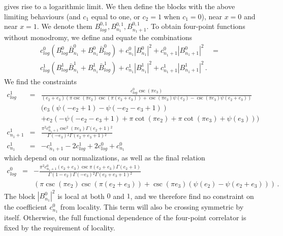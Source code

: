 \documentclass[12pt]{article}
\numberwithin{equation}{section}
\numberwithin{equation}{section}
\numberwithin{table}{section}\setlength{\multlinegap}{25pt}
\begin{document}
gives rise to a logarithmic limit.
We then define the blocks  with the above limiting behaviours (and $c_1$ equal to one, or $c_2=1$ when $c_1=0$), near $x=0$ and near $x=1$. We denote them
$B_{log}^{0,1},B_{n_1}^{0,1}, B_{n_1+1}^{0,1}$. To obtain four-point functions without monodromy, we define and equate
the combinations
\begin{eqnarray}
c^0_{log} (B_{log}^0  \bar{B}_{n_1}^0+ B_{n_1}^0 \bar{B}_{log}^0)
+c^0_{n_1} | B_{n_1}^0 |^2
+c^0_{n_1+1} |B_{n_1+1}^0 |^2
&=& \nonumber \\
 c^1_{log} (B_{log}^1  \bar{B}_{n_1}^1+ B_{n_1}^1 \bar{B}_{log}^1)
+c^1_{n_1} | B_{n_1}^1 |^2
+c^1_{n_1+1} |B_{n_1+1}^1 |^2 \, .
& & 
\end{eqnarray}
We find the constraints
\begin{eqnarray}
c^1_{log} &=& \frac{c^0_{log}\csc \left(\pi  e_3\right)  }{\left(e_2+e_3\right) \left(\pi  \csc \left(\pi  e_2\right) \csc \left(\pi 
   \left(e_2+e_3\right)\right)+\csc \left(\pi  e_3\right) \psi\left(e_2\right)-\csc \left(\pi  e_3\right) \psi
  \left(e_2+e_3\right)\right)}
\nonumber \\
& & 
\Big(e_3
   \left( \psi(-e_2+1)-\psi(-e_2-e_3+1) \right) \nonumber \\
& & +e_2 \left(-\psi(-e_2-e_3+1)+\pi  \cot \left(\pi  e_2\right)+\pi  \cot \left(\pi  e_3\right)+\psi
  \left(e_3\right) \right)\Big)
\nonumber \\
c^1_{n_1+1} &=&
\frac{\pi ^2 c^0_{n_1+1} \csc ^2\left(\pi  e_3\right) \Gamma \left(e_2+1\right){}^2}{\Gamma \left(-e_3\right){}^2 \Gamma
   \left(e_2+e_3+1\right){}^2}\nonumber \\
c^1_{n_1} &=& -c^1_{n_1+1}-2 c^1_{log}+2 c^0_{log} + c^0_{n_1}
\end{eqnarray}
which depend on our normalizations, as well as the final relation
\begin{eqnarray}
c^0_{log} &=& -\frac{\pi ^2 c^0_{n_1+1} \left(e_2+e_3\right) \csc \pi \left(e_2+e_3\right) \Gamma \left(e_2+1\right)
}{\Gamma \left(1-e_2\right) \Gamma \left(-e_3\right){}^2 \Gamma \left(e_2+e_3+1\right){}^2} 
\nonumber \\
& & 
\left(\pi  \csc
   \left(\pi  e_2\right) \csc \left(\pi  \left(e_2+e_3\right)\right)+\csc \left(\pi  e_3\right) \left(\psi \left(e_2\right)-\psi
   \left(e_2+e_3\right)\right)\right) \, .
\nonumber
\end{eqnarray}
The block $|B^0_{n_1}|^2$ is local at both $0$ and $1$, and we therefore find no constraint on the coefficient $c_{n_1}^0$
from locality. This term will also be crossing symmetric by itself. Otherwise, the full functional dependence of the four-point correlator is fixed by 
the requirement of locality.
\end{document}

